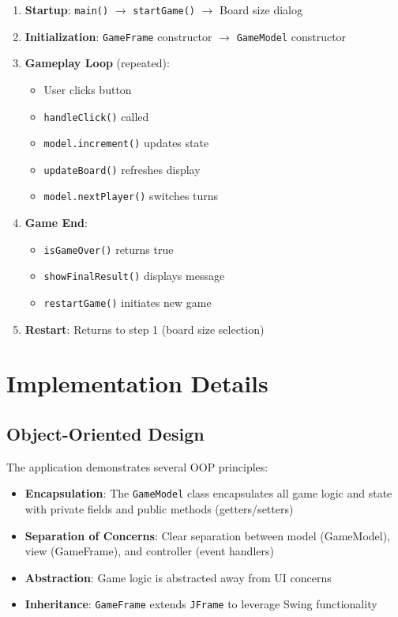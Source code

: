 \documentclass[12pt,a4paper]{article}
\begin{document}
\begin{enumerate}
    \item \textbf{Startup}: \texttt{main()} $\rightarrow$ \texttt{startGame()} $\rightarrow$ Board size dialog
    \item \textbf{Initialization}: \texttt{GameFrame} constructor $\rightarrow$ \texttt{GameModel} constructor
    \item \textbf{Gameplay Loop} (repeated):
    \begin{itemize}
        \item User clicks button
        \item \texttt{handleClick()} called
        \item \texttt{model.increment()} updates state
        \item \texttt{updateBoard()} refreshes display
        \item \texttt{model.nextPlayer()} switches turns
    \end{itemize}
    \item \textbf{Game End}:
    \begin{itemize}
        \item \texttt{isGameOver()} returns true
        \item \texttt{showFinalResult()} displays message
        \item \texttt{restartGame()} initiates new game
    \end{itemize}
    \item \textbf{Restart}: Returns to step 1 (board size selection)
\end{enumerate}

\newpage

\section{Implementation Details}

\subsection{Object-Oriented Design}

The application demonstrates several OOP principles:

\begin{itemize}
    \item \textbf{Encapsulation}: The \texttt{GameModel} class encapsulates all game logic and state with private fields and public methods (getters/setters)
    \item \textbf{Separation of Concerns}: Clear separation between model (GameModel), view (GameFrame), and controller (event handlers)
    \item \textbf{Abstraction}: Game logic is abstracted away from UI concerns
    \item \textbf{Inheritance}: \texttt{GameFrame} extends \texttt{JFrame} to leverage Swing functionality
\end{itemize}
\end{document}
